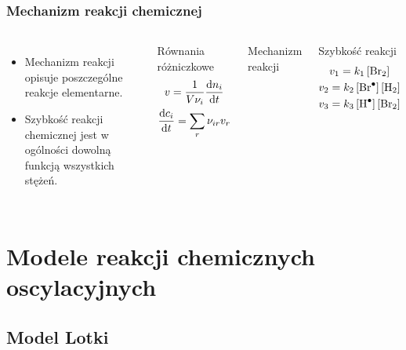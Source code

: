\documentclass{beamer}
\begin{document}
\begin{frame}
\frametitle{Mechanizm reakcji chemicznej}
\begin{columns}
\begin{itemize}
\item Mechanizm reakcji opisuje poszczególne reakcje elementarne.
\item Szybkość reakcji chemicznej jest w ogólności dowolną funkcją wszystkich stężeń.
\end{itemize}
\begin{block}{Równania różniczkowe}
\begin{gather*}
v=\frac{1}{V\nu_{i}}\dv{n_{i}}{t} \\
\dv{c_{i}}{t} = \sum_{r}\nu_{ir}v_r
\end{gather*}
\end{block}
\begin{block}{Mechanizm reakcji}
\begin{center}
 \\
 \\
\end{center}
\end{block}
\begin{block}{Szybkość reakcji}
\begin{gather*}
v_{1} = k_{1}\left[\ce{Br2}\right] \\
v_{2} = k_{2}\left[\ce{Br^{.}}\right]\left[\ce{H2}\right] \\
v_{3} = k_{3}\left[\ce{H^{.}}\right]\left[\ce{Br2}\right]
\end{gather*}
\end{block}
\end{columns}
\end{frame}

\section{Modele reakcji chemicznych oscylacyjnych}
\subsection{Model Lotki}
\end{document}
